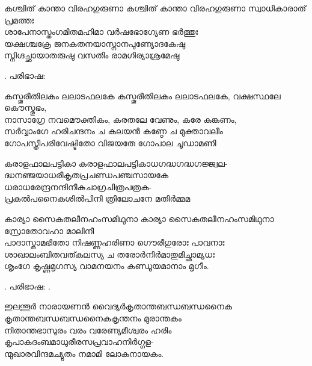 \begin{enumerate}

\begin{slokam}{\VMk}{\KD}{കശ്ചിത് കാന്താ വിരഹഗുരുണാ}
കശ്ചിത് കാന്താ വിരഹഗുരുണാ സ്വാധികാരാത് പ്രമത്തഃ\\
ശാപേനാസ്തംഗമിതമഹിമാ വർഷഭോഗ്യേണ ഭർത്തുഃ\\
യക്ഷശ്ചക്രേ ജനകതനയാസ്നാനപുണ്യോദകേഷു\\
സ്നിഗ്ദച്ഛായാതരുഷു വസതിം രാമഗിര്യാശ്രമേഷു
\end{slokam}


.  പരിഭാഷ: 

\begin{slokam}{\VSv}{\LS}{കസ്തൂരീതിലകം ലലാടഫലകേ}
കസ്തൂരീതിലകം ലലാടഫലകേ, വക്ഷസ്ഥലേ കൌസ്തുഭം,\\
നാസാഗ്രേ നവമൌക്തികം, കരതലേ വേണും, കരേ കങ്കണം,\\
സര്‍വ്വാംഗേ ഹരിചന്ദനം ച കലയന്‍ കണ്ഠേ ച മുക്താവലീം\\
ഗോപസ്ത്രീപരിവേഷ്ടിതോ വിജയതേ ഗോപാല ചൂഡാമണി
\end{slokam}



\begin{slokam}{\VPc}{\Rav}{കരാളഫാലപട്ടികാ}
കരാളഫാലപട്ടികാധഗദ്ധഗദ്ധഗജ്ജ്വല-\\
ദ്ധനഞ്ജയാധരീകൃതപ്രചണ്ഡപഞ്ചസായകേ\\
ധരാധരേന്ദ്രനന്ദിനീകുചാഗ്രചിത്രപത്രക-\\
പ്രകൽപനൈകശിൽപിനി ത്രിലോചനേ മതിർമ്മമ
\end{slokam}


\begin{slokam}{\VSv}{\KD}{കാര്യാ സൈകതലീനഹംസമിഥുനാ}
കാര്യാ സൈകതലീനഹംസമിഥുനാ സ്രോതോവഹാ മാലിനീ\\
പാദാസ്താമഭിതോ നിഷണ്ണഹരിണാ ഗൌരീഗുരോഃ പാവനാഃ\\
ശാഖാലംബിതവത്കലസ്യ ച തരോര്‍നിര്‍മാതുമിച്ഛാമ്യധഃ\\
ശൃംഗേ കൃഷ്ണമൃഗസ്യ വാമനയനം കണ്ഡൂയമാനാം മൃഗീം.
\end{slokam}


. പരിഭാഷ: . 

\begin{slokam}{\VPc}{ഇലന്തൂർ നാരായണൻ വൈദ്യർ}{കൃതാന്തബന്ധബന്ധനൈക}
 കൃതാന്തബന്ധബന്ധനൈകകൃന്തനം മുരാന്തകം\\
നിതാന്തഭാസുരം വരം വരേണ്യമീശ്വരം ഹരിം\\
കൃപാകദംബമാധുരീരസപ്രവാഹനിർഗ്ഗള-\\
ന്മുഖാരവിന്ദമച്യുതം നമാമി ലോകനായകം.
\end{slokam}


\end{enumerate}
